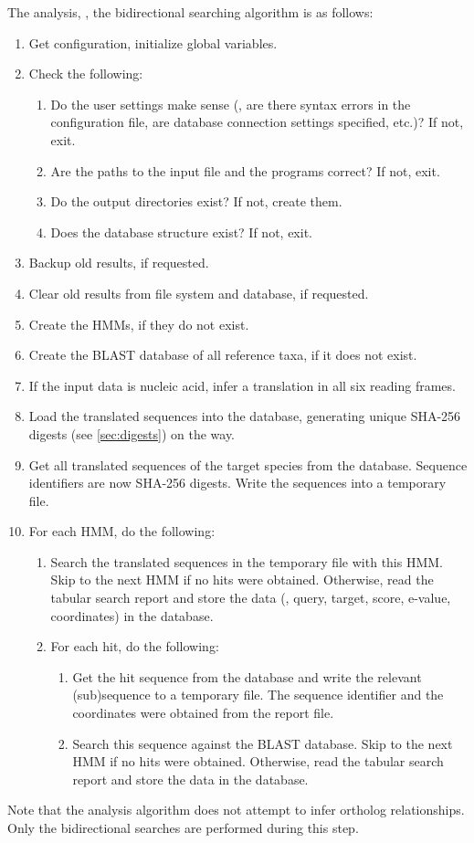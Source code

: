The analysis, \ie, the bidirectional searching algorithm is as follows:

\begin{enumerate}
	\item Get configuration, initialize global variables.
	\item Check the following:
	\begin{enumerate}
		\item Do the user settings make sense (\eg, are there syntax errors in the
			configuration file, are database connection settings specified, etc.)? If
			not, exit.
		\item Are the paths to the input file and the programs correct? If not,
			exit.
		\item Do the output directories exist? If not, create them.
		\item Does the database structure exist? If not, exit.
	\end{enumerate}
	\item Backup old results, if requested.
	\item Clear old results from file system and database, if requested.
	\item Create the HMMs, if they do not exist.
	\item Create the BLAST database of all reference taxa, if it does not exist.
	\item If the input data is nucleic acid, infer a translation in all six
		reading frames.
	\item Load the translated sequences into the database, generating unique
		SHA-256 digests (see \autoref{sec:digests}) on the way.
	\item Get all translated sequences of the target species from the database.
		Sequence identifiers are now SHA-256 digests. Write the sequences into a
		temporary file.
	\item For each HMM, do the following:
	\begin{enumerate}
		\item Search the translated sequences in the temporary file with this HMM.
			Skip to the next HMM if no hits were obtained. Otherwise, read the tabular
			search report and store the data (\eg, query, target, score, e-value,
			coordinates) in the database.
		\item For each hit, do the following:
		\begin{enumerate}
			\item Get the hit sequence from the database and write the relevant
				(sub)sequence to a temporary file. The sequence identifier and the
				coordinates were obtained from the  report file.
			\item Search this sequence against the BLAST database. Skip to the next
				HMM if no hits were obtained. Otherwise, read the tabular search report
				and store the data in the database. 
		\end{enumerate}
	\end{enumerate}
\end{enumerate}

Note that the analysis algorithm does not attempt to infer ortholog
relationships. Only the bidirectional searches are performed during this step. 
